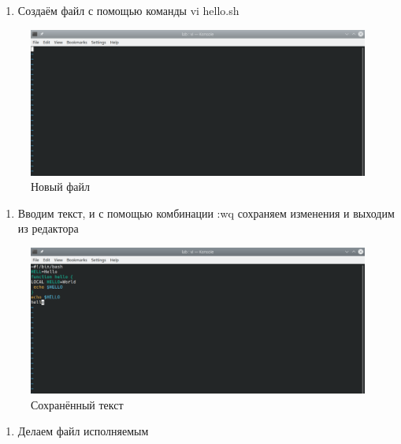 \documentclass[
  12pt,
  a4paper,
]{scrreprt}
\providecommand{\tightlist}{%
  \setlength{\itemsep}{0pt}\setlength{\parskip}{0pt}}
\begin{document}
\begin{enumerate}
\def\labelenumi{\arabic{enumi}.}
\setcounter{enumi}{1}
\tightlist
\item
  Создаём файл с помощью команды vi hello.sh
\end{enumerate}

\begin{figure}
\hypertarget{fig:002}{%
\centering
\includegraphics[width=1\textwidth,height=\textheight]{image/2.png}
\caption{Новый файл}\label{fig:002}
}
\end{figure}

\begin{enumerate}
\def\labelenumi{\arabic{enumi}.}
\setcounter{enumi}{2}
\tightlist
\item
  Вводим текст, и с помощью комбинации :wq сохраняем изменения и выходим
  из редактора
\end{enumerate}

\begin{figure}
\hypertarget{fig:003}{%
\centering
\includegraphics[width=1\textwidth,height=\textheight]{image/4.png}
\caption{Сохранённый текст}\label{fig:003}
}
\end{figure}

\begin{enumerate}
\def\labelenumi{\arabic{enumi}.}
\setcounter{enumi}{3}
\tightlist
\item
  Делаем файл исполняемым
\end{enumerate}
\end{document}

